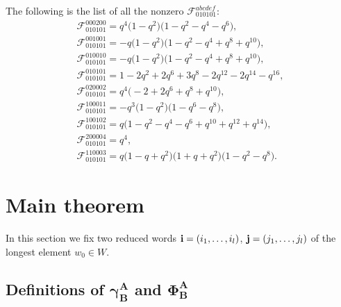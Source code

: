 \begin{example}
The following is the list of all the nonzero $\mathscr{F}^{abcdef}_{010101}$:
\begin{gather*}
\mathscr{F}^{000200}_{010101}
  = q^4 \big(1 - q^2\big) \big(1 - q^2 - q^4 - q^6\big),
\\
\mathscr{F}^{001001}_{010101}
  = -q \big(1 - q^2\big) \big(1 - q^2 - q^4 + q^8 + q^{10}\big), \\
\mathscr{F}^{010010}_{010101}
 = -q \big(1 - q^2\big) \big(1 - q^2 - q^4 + q^8 + q^{10}\big),
\\
\mathscr{F}^{010101}_{010101}
 =  1 - 2 q^2 + 2 q^6 + 3 q^8 - 2 q^{12} - 2 q^{14} - q^{16}, \\
\mathscr{F}^{020002}_{010101}
 =  q^4 \big({-}2 + 2 q^6 + q^8 + q^{10}\big),
\\
\mathscr{F}^{100011}_{010101}
 = -q^3 \big(1 - q^2\big) \big(1 - q^6 - q^8\big), \\
\mathscr{F}^{100102}_{010101}
 =  q \big(1 - q^2 - q^4 - q^6 + q^{10} + q^{12} + q^{14}\big),
\\
\mathscr{F}^{200004}_{010101}  = q^4, \\
\mathscr{F}^{11000 3}_{010101}
 = q \big(1 - q + q^2\big) \big(1 + q + q^2\big) \big(1 - q^2 - q^8\big).
\end{gather*}
\end{example}


\section{Main theorem}\label{a:sec5}

In this section we f\/ix two reduced words ${\bf i}=(i_1,\ldots,i_l)$,
${\bf j}=(j_1,\ldots,j_l)$ of the longest element $w_0\in W$.

\subsection[Definitions of $\gamma^A_B$ and $\Phi^A_B$]{Def\/initions of $\boldsymbol{\gamma^A_B}$ and $\boldsymbol{\Phi^A_B}$}

